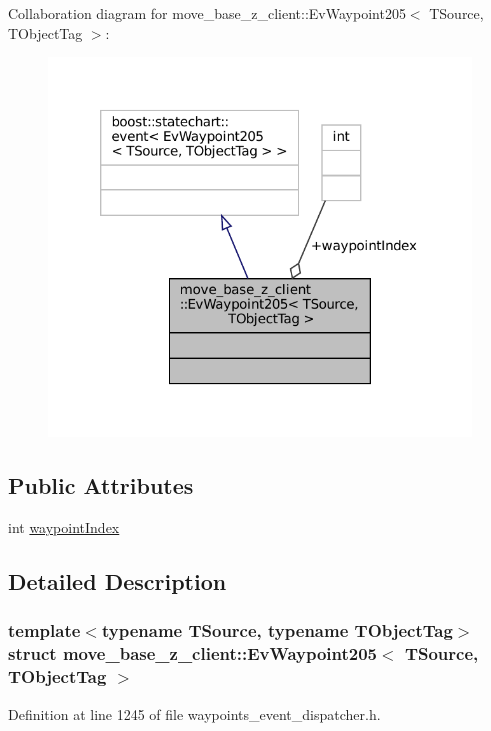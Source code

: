 Collaboration diagram for move\+\_\+base\+\_\+z\+\_\+client\+:\+:Ev\+Waypoint205$<$ T\+Source, T\+Object\+Tag $>$\+:
\nopagebreak
\begin{figure}[H]
\begin{center}
\leavevmode
\includegraphics[width=320pt]{structmove__base__z__client_1_1EvWaypoint205__coll__graph}
\end{center}
\end{figure}
\subsection*{Public Attributes}
\begin{DoxyCompactItemize}
\item 
int \hyperlink{structmove__base__z__client_1_1EvWaypoint205_a443fa6ae021da1ed35eb875127d561e5}{waypoint\+Index}
\end{DoxyCompactItemize}


\subsection{Detailed Description}
\subsubsection*{template$<$typename T\+Source, typename T\+Object\+Tag$>$\newline
struct move\+\_\+base\+\_\+z\+\_\+client\+::\+Ev\+Waypoint205$<$ T\+Source, T\+Object\+Tag $>$}



Definition at line 1245 of file waypoints\+\_\+event\+\_\+dispatcher.\+h.



